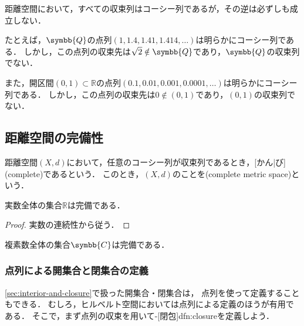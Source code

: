 \documentclass[../sotsu.tex]{subfiles}
\begin{document}
距離空間において，すべての収束列はコーシー列であるが，その逆は必ずしも成立しない．

たとえば，$\symbb{Q}$の点列$(1, 1.4, 1.41, 1.414, \dotsc)$は明らかにコーシー列である．
しかし，この点列の収束先は$\sqrt{2} \notin \symbb{Q}$であり，$\symbb{Q}$の収束列でない．

また，開区間$(0, 1) \subset ℝ$の点列$(0.1, 0.01, 0.001, 0.0001, \dotsc)$は明らかにコーシー列である．
しかし，この点列の収束先は$0 \notin (0, 1)$であり，$(0, 1)$の収束列でない．


\subsection{距離空間の完備性}
\label{sec:complete-metric-space}

\begin{definition}
    \label{dfn:complete-metric-space}
    距離空間$(X, d)$において，任意のコーシー列が収束列であるとき，[かん|び](complete)であるという．
    このとき，$(X, d)$のことを(complete metric space)という．
\end{definition}


\begin{proposition}[実数の完備性]
    \label{thm:completeness-of-real-numbers}
    実数全体の集合$ℝ$は完備である．
\end{proposition}

\begin{proof}
    実数の連続性から従う．
\end{proof}


\begin{corollary}
    \label{thm:completeness-of-complex-numbers}
    複素数全体の集合$\symbb{C}$は完備である．
\end{corollary}



\subsubsection*{点列による開集合と閉集合の定義}

\cref{sec:interior-and-closure}で扱った開集合・閉集合は，
点列を使って定義することもできる．
むしろ，ヒルベルト空間においては点列による定義のほうが有用である．
そこで，まず点列の収束を用いて-[閉包]{dfn:closure}を定義しよう．
\end{document}
